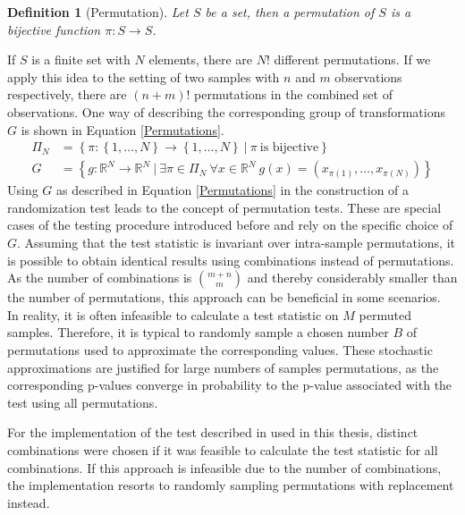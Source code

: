 \documentclass[12pt, a4paper]{article}
\theoremstyle{MAstyle} \newtheorem{assumption}{Assumption}[section]
\theoremstyle{MAstyle} \newtheorem{definition}{Definition}[section]
\theoremstyle{MAstyle} \newtheorem{theorem}{Theorem}[section]
\begin{document}
			\begin{definition}[Permutation]\label{permutation}
				Let $S$ be a set, then a permutation of $S$ is a bijective function $\pi: S \rightarrow S$.
			\end{definition}
			If $S$ is a finite set with $N$ elements, there are $N!$ different permutations. If we apply this idea to the setting of two samples with $n$ and $m$ observations respectively, there are $(n+m)!$ permutations in the combined set of observations. One way of describing the corresponding group of transformations $G$ is shown in Equation \ref{Permutations}.
			\begin{equation}\label{Permutations}
				\begin{split}
					\Pi_N &= \left\{\pi: \left\{1, \dots, N \right\} \rightarrow \left\{1, \dots, N \right\} \ \vert \ \pi \ \text{is bijective} \right\} \\
					G &= \left\{g:\mathbb{R}^N \rightarrow \mathbb{R}^N \ \vert \ \exists \pi \in \Pi_N \ \forall x \in \mathbb{R}^N \ g(x) = \left(x_{\pi(1)}, \dots, x_{\pi(N)}\right) \right\}
				\end{split}
			\end{equation}
			Using $G$ as described in Equation \ref{Permutations} in the construction of a randomization test leads to the concept of permutation tests. These are special cases of the testing procedure introduced before and rely on the specific choice of $G$. Assuming that the test statistic is invariant over intra-sample permutations, it is possible to obtain identical results using combinations instead of permutations. As the number of combinations is $\binom{m+n}{m}$ and thereby considerably smaller than the number of permutations, this approach can be beneficial in some scenarios.\\

			In reality, it is often infeasible to calculate a test statistic on $M$ permuted samples. Therefore, it is typical to randomly sample a chosen number $B$ of permutations used to approximate the corresponding values. These stochastic approximations are justified for large numbers of samples permutations, as the corresponding p-values converge in probability to the p-value associated with the test using all permutations. 
			
			For the implementation of the test described in \cite{bugni_permutation_2021} used in this thesis, distinct combinations were chosen if it was feasible to calculate the test statistic for all combinations. If this approach is infeasible due to the number of combinations, the implementation resorts to randomly sampling permutations with replacement instead.
			
\end{document}
